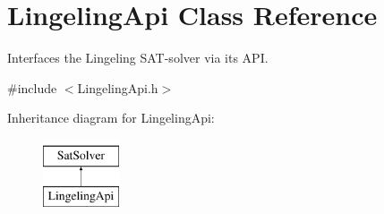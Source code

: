 \hypertarget{classLingelingApi}{\section{Lingeling\-Api Class Reference}
\label{classLingelingApi}
}


Interfaces the Lingeling S\-A\-T-\/solver via its A\-P\-I.  




{\ttfamily \#include $<$Lingeling\-Api.\-h$>$}

Inheritance diagram for Lingeling\-Api\-:\begin{figure}[H]
\begin{center}
\leavevmode
\includegraphics[height=2.000000cm]{classLingelingApi}
\end{center}
\end{figure}
